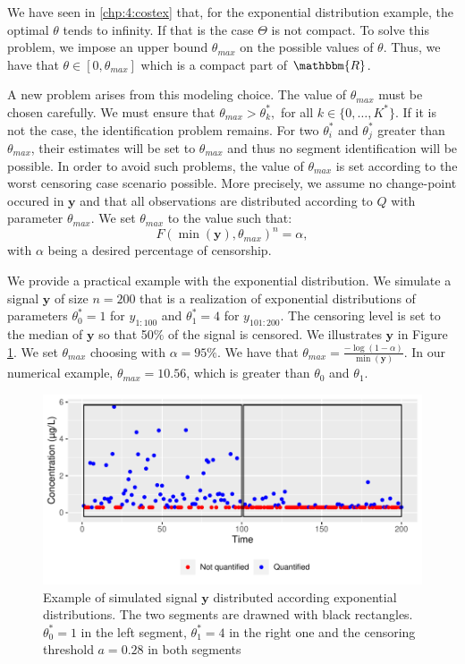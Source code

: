 We have seen in \ref{chp:4:costex} that, for the exponential distribution example, the optimal $\theta$ tends to infinity. If that is the case $\Theta$ is not compact. To solve this problem, we impose an upper bound $\theta_{max}$ on the possible values of $\theta$. Thus, we have that $\theta \in [0,\theta_{max}]$ which is a compact part of $\mathbbm{R}$. 

A new problem arises from this modeling choice. The value of $\theta_{max}$ must be chosen carefully. We must ensure that $\theta_{max}> \theta^*_k,$ for all $k \in \{0,\dots,K^*\}$. If it is not the case, the identification problem remains. For two $\theta^*_i$ and $\theta^*_j$    greater than $\theta_{max}$, their estimates will be set to $\theta_{max}$ and thus no segment identification will be possible. In order to avoid such problems, the value of $\theta_{max}$ is set according to the worst censoring case scenario possible. More precisely, we assume no change-point occured in $\bm y$ and that all observations are distributed according to $Q$ with parameter $\theta_{max}$. We set $\theta_{max}$ to the value such that: 
$$F(\min(\bm y),\theta_{max})^n = \alpha,$$
with $\alpha$ being a desired percentage of censorship. 

We provide a practical example with the exponential distribution. We simulate a signal $\bm y$ of size $n = 200$ that is a realization of exponential distributions of parameters $\theta^*_0 = 1$ for $y_{1:100}$ and $\theta^*_1 = 4$ for $y_{101:200}$. The censoring level is set to the median of $\bm y$ so that 50$\%$ of the signal is censored. We illustrates $\bm y$ in Figure \ref{fig:theta_max}. We set $\theta_{max}$ choosing with $\alpha = 95\%$. We have that $\theta_{max} = \frac{-\log(1-\alpha)}{\min(\bm y)}$. In our numerical example, $\theta_{max} = 10.56$, which is greater than $\theta_0$ and $\theta_1$.

\begin{figure}[ht]
    \centering
    \includegraphics{figs/Chap4/theta_max_ex.pdf}
    \caption{Example of simulated signal $\bm y$ distributed according exponential distributions. The two segments are drawned with black rectangles. $\theta^*_0 = 1$ in the left segment, $\theta^*_1 = 4$ in the right one and the censoring threshold $a = 0.28$ in both segments}
    \label{fig:theta_max}
\end{figure}

